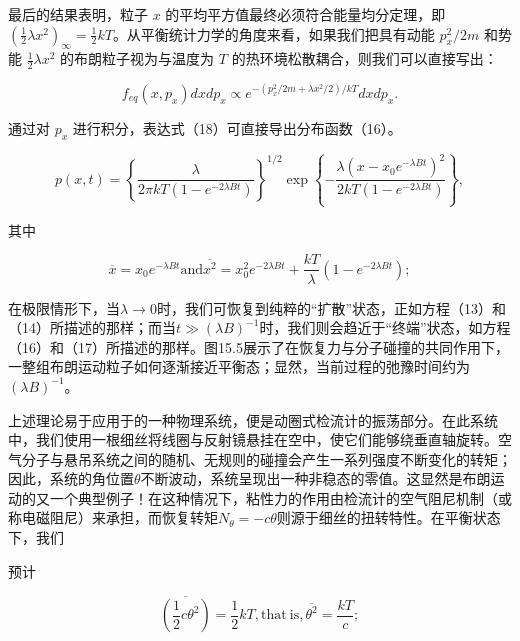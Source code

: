 最后的结果表明，粒子 \(x\) 的平均平方值最终必须符合能量均分定理，即 \((\frac{1}{2}\lambda x^2)_{\infty} = \frac{1}{2}kT\)。从平衡统计力学的角度来看，如果我们把具有动能 \(p_x^2/2m\) 和势能 \(\frac{1}{2}\lambda x^2\) 的布朗粒子视为与温度为 \(T\) 的热环境松散耦合，则我们可以直接写出：

\begin{equation}\tag{15.4.18}\label{eq:15.4.18}
f _ { e q } ( x , p _ { x } ) d x d p _ { x } \propto e ^{- ( p _ { x} ^{2} / 2 m + \lambda x ^{2} / 2 ) / k T } d x d p _ { x } .
\end{equation}

通过对 \(p_x\) 进行积分，表达式（18）可直接导出分布函数（16）。

\begin{equation}
p ( x , t ) = \left\{ \frac { \lambda } { 2 \pi k T ( 1 - e ^{- 2 \lambda B t} ) } \right\} ^{1 / 2} \exp \left\{ - \frac { \lambda ( x - x _ { 0 } e ^{- \lambda B t} ) ^{2} } { 2 k T ( 1 - e ^{- 2 \lambda B t} ) } \right\} ,
\end{equation}

其中

\begin{equation}\tag{15.4.19}\label{eq:15.4.19}
\overline { { x } } = x _ { 0 } e ^{- \lambda B t}  \mathrm { a n d }  \overline { { x ^{2} } } = x _ { 0 } ^{2} e ^{- 2 \lambda B t} + \frac { k T } { \lambda } ( 1 - e ^{- 2 \lambda B t} ) ;
\end{equation}

在极限情形下，当\(\lambda \to 0\)时，我们可恢复到纯粹的``扩散''状态，正如方程（13）和（14）所描述的那样；而当\(t \gg (\lambda B)^{-1}\)时，我们则会趋近于``终端''状态，如方程（16）和（17）所描述的那样。图15.5展示了在恢复力与分子碰撞的共同作用下，一整组布朗运动粒子如何逐渐接近平衡态；显然，当前过程的弛豫时间约为\((\lambda B)^{-1}\)。

上述理论易于应用于的一种物理系统，便是动圈式检流计的振荡部分。在此系统中，我们使用一根细丝将线圈与反射镜悬挂在空中，使它们能够绕垂直轴旋转。空气分子与悬吊系统之间的随机、无规则的碰撞会产生一系列强度不断变化的转矩；因此，系统的角位置\(\theta\)不断波动，系统呈现出一种非稳态的零值。这显然是布朗运动的又一个典型例子！在这种情况下，粘性力的作用由检流计的空气阻尼机制（或称电磁阻尼）来承担，而恢复转矩\(N_{\theta} = -c\theta\)则源于细丝的扭转特性。在平衡状态下，我们

预计

\begin{equation}\tag{15.4.20}\label{eq:15.4.20}
\overline { { \left( \frac { 1 } { 2 } c \theta ^{2} \right) } } = \frac { 1 } { 2 } k T ,  \mathrm { t h a t ~ i s , }  \overline { { \theta ^{2} } } = \frac { k T } { c } ;
\end{equation}

